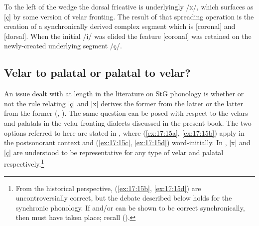 \ea%
    \label{ex:17:14}
\z 

To the left of the wedge the dorsal fricative is underlyingly /x/, which surfaces as [ç] by some version of velar fronting. The result of that spreading operation is the creation of a synchronically derived complex segment which is [coronal] and [dorsal]. When the initial /i/ was elided the feature [coronal] was retained on the newly-created underlying segment /ç/.

\subsection{Velar to palatal or palatal to velar?}\label{sec:17.3.3}

An issue dealt with at length in the literature on StG phonology is whether or not the rule relating [ç] and [x] derives the former from the latter or the latter from the former (, ). The same question can be posed with respect to the velars and palatals in the velar fronting dialects discussed in the present book. The two options referred to here are stated in , where (\ref{ex:17:15a}, \ref{ex:17:15b}) apply in the postsonorant context and (\ref{ex:17:15c}, \ref{ex:17:15d}) word-initially. In , [x] and [ç] are understood to be representative for any type of velar and palatal respectively.\footnote{{From the historical perspective, (\ref{ex:17:15b}, \ref{ex:17:15d}) are uncontroversially correct, but the debate described below holds for the synchronic phonology. If  and/or  can be shown to be correct synchronically, then  must have taken place; recall  ().}}

